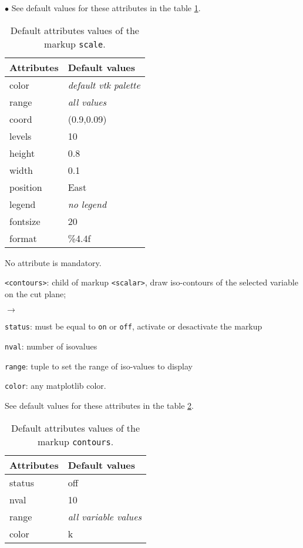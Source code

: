 \documentclass[a4paper,10pt,twoside]{csshortdoc}
\begin{document}
\begin{list}{$\bullet$}{}
See default values for these attributes in the table \ref{table:scale}.

\begin{table}[htbp]
\begin{center}
\begin{tabular}{|l|l|}
\hline
\textbf{Attributes} & \textbf{Default values} \\
\hline
color & \textit{default vtk palette} \\
range & \textit{all values} \\
coord & (0.9,0.09) \\
levels & 10 \\
height & 0.8 \\
width & 0.1 \\
position & East \\
legend & \textit{no legend} \\
fontsize & 20 \\
format & \%4.4f \\
\hline
\end{tabular}
\end{center}
\caption{Default attributes values of the markup \texttt{scale}.}
\label{table:scale}
\end{table}

No attribute is mandatory.

\item \texttt{<contours>}: child of markup \texttt{<scalar>}, draw iso-contours of the selected variable on the cut plane;
\begin{list}{$\rightarrow$}{}
\item \texttt{status}: must be equal to \texttt{on} or \texttt{off}, activate or desactivate the markup
\item \texttt{nval}: number of isovalues
\item \texttt{range}: tuple to set the range of iso-values to display
\item \texttt{color}: any matplotlib color.
\end{list}

See default values for these attributes in the table \ref{table:contours}.

\begin{table}[htbp]
\begin{center}
\begin{tabular}{|l|l|}
\hline
\textbf{Attributes} & \textbf{Default values} \\
\hline
status & off \\
nval & 10 \\
range & \textit{all variable values} \\
color & k \\
\hline
\end{tabular}
\end{center}
\caption{Default attributes values of the markup \texttt{contours}.}
\label{table:contours}
\end{table}


\end{list}
\end{document}
